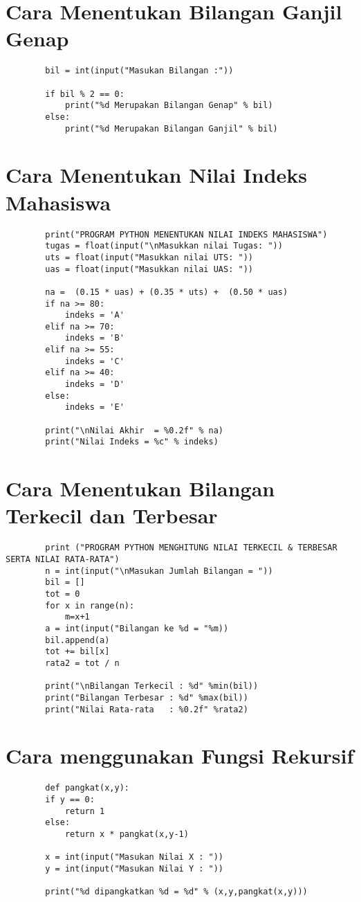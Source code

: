 \documentclass{article}
\begin{document}
	\section {Cara Menentukan Bilangan Ganjil Genap}
	\begin{lstlisting}
		bil = int(input("Masukan Bilangan :"))
		
		if bil % 2 == 0:
			print("%d Merupakan Bilangan Genap" % bil)
		else:
			print("%d Merupakan Bilangan Ganjil" % bil)
	\end{lstlisting}

	\section {Cara Menentukan Nilai Indeks Mahasiswa}
	\begin{lstlisting}
		print("PROGRAM PYTHON MENENTUKAN NILAI INDEKS MAHASISWA")
		tugas = float(input("\nMasukkan nilai Tugas: "))
		uts = float(input("Masukkan nilai UTS: "))
		uas = float(input("Masukkan nilai UAS: "))
		
		na =  (0.15 * uas) + (0.35 * uts) +  (0.50 * uas)
		if na >= 80:
			indeks = 'A'
		elif na >= 70:
			indeks = 'B'
		elif na >= 55:
			indeks = 'C'
		elif na >= 40:
			indeks = 'D'
		else:
			indeks = 'E'
		
		print("\nNilai Akhir  = %0.2f" % na)
		print("Nilai Indeks = %c" % indeks)
	\end{lstlisting}

	\section {Cara Menentukan Bilangan Terkecil dan Terbesar}
	\begin{lstlisting}
		print ("PROGRAM PYTHON MENGHITUNG NILAI TERKECIL & TERBESAR SERTA NILAI RATA-RATA")
		n = int(input("\nMasukan Jumlah Bilangan = "))
		bil = []
		tot = 0
		for x in range(n):
			m=x+1
		a = int(input("Bilangan ke %d = "%m))
		bil.append(a)
		tot += bil[x]
		rata2 = tot / n
		
		print("\nBilangan Terkecil : %d" %min(bil))
		print("Bilangan Terbesar : %d" %max(bil))
		print("Nilai Rata-rata   : %0.2f" %rata2)
	\end{lstlisting}
	
	\section {Cara menggunakan Fungsi Rekursif}
	\begin{lstlisting}
		def pangkat(x,y):
		if y == 0:
			return 1
		else:
			return x * pangkat(x,y-1)
		
		x = int(input("Masukan Nilai X : "))
		y = int(input("Masukan Nilai Y : "))
		
		print("%d dipangkatkan %d = %d" % (x,y,pangkat(x,y)))
	\end{lstlisting}
	
\end{document}
